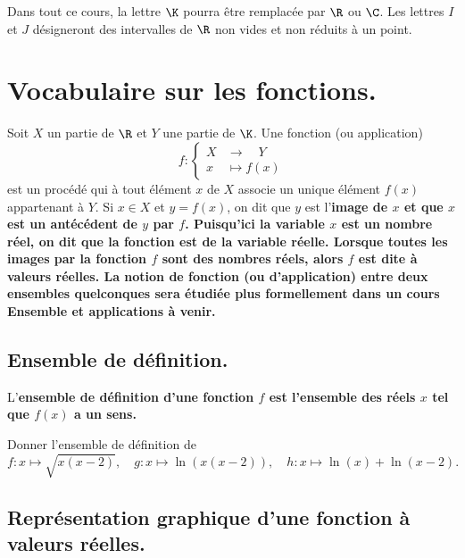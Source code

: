 \documentclass[11pt]{article}
\begin{document}


\thispagestyle{fancy}

Dans tout ce cours, la lettre $\K$ pourra être remplacée par $\R$ ou $\C$.\n
Les lettres $I$ et $J$ désigneront des intervalles de $\R$ non vides et non réduits à un point.

\section{Vocabulaire sur les fonctions.}

Soit $X$ un partie de $\R$ et $Y$ une partie de $\K$. Une fonction (ou application)
\begin{equation*}
    f:\begin{cases}
        X&\to\quad Y\\
        x&\mapsto f(x)
    \end{cases}
\end{equation*}
est un procédé qui à tout élément $x$ de $X$ associe un unique élément $f(x)$ appartenant à $Y$.\n
Si $x\in X$ et $y=f(x)$, on dit que $y$ est l'\bf{image} de $x$ et que $x$ est un \bf{antécédent} de $y$ par $f$.\n
Puisqu'ici la variable $x$ est un nombre réel, on dit que la fonction est de la \bf{variable réelle}.\n
Lorsque toutes les images par la fonction $f$ sont des nombres réels, alors $f$ est dite \bf{à valeurs réelles}.\n
La notion de fonction (ou d'application) entre deux ensembles quelconques sera étudiée plus formellement dans un cours Ensemble et applications à venir.

\subsection{Ensemble de définition.}

\begin{rappel}{}{}
    L'\bf{ensemble de définition} d'une fonction $f$ est l'ensemble des réels $x$ tel que $f(x)$ a un sens.
\end{rappel}

\begin{ex}{}{}
    Donner l'ensemble de définition de
    \begin{equation*}
        f:x\mapsto\sqrt{x(x-2)},\quad g:x\mapsto\ln(x(x-2)),\quad h:x\mapsto\ln(x)+\ln(x-2).
    \end{equation*}
\end{ex}

\subsection{Représentation graphique d'une fonction à valeurs réelles.}
\end{document}
